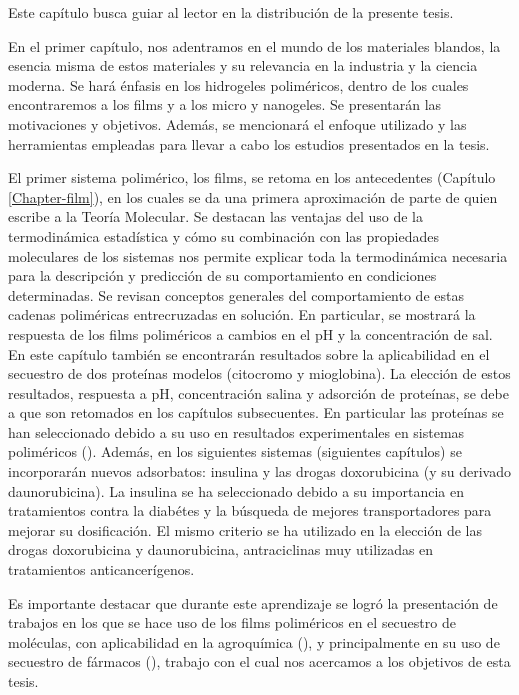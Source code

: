 \label{ruta}

 
Este cap\'itulo busca guiar al lector en la distribuci\'on de la presente tesis.

En el primer cap\'itulo, nos adentramos en el mundo de los materiales blandos, la esencia misma de estos materiales y su relevancia en la industria y la ciencia moderna. Se har\'a \'enfasis en los hidrogeles polim\'ericos, dentro de los cuales encontraremos a los films y a los micro y nanogeles. Se presentar\'an las motivaciones y objetivos. Adem\'as, se mencionar\'a el enfoque utilizado y las herramientas empleadas para llevar a cabo los estudios presentados en la tesis.

El primer sistema polim\'erico, los films, se retoma en los antecedentes (Cap\'itulo \ref{Chapter-film}), en los cuales se da una primera aproximaci\'on de parte de quien escribe a la Teor\'ia Molecular. Se destacan las ventajas del uso de la termodin\'amica estad\'istica y c\'omo su combinaci\'on con las propiedades moleculares de los sistemas nos permite explicar toda la termodin\'amica necesaria para la descripci\'on y predicci\'on de su comportamiento en condiciones determinadas. Se revisan conceptos generales del comportamiento de estas cadenas polim\'ericas entrecruzadas en soluci\'on. En particular, se mostrar\'a la respuesta de los films polim\'ericos a cambios en el pH y la concentraci\'on de sal. En este cap\'itulo tambi\'en se encontrar\'an resultados sobre la aplicabilidad en el secuestro de dos prote\'inas modelos (citocromo y mioglobina). La elecci\'on de estos resultados, respuesta a pH, concentraci\'on salina y adsorci\'on de prote\'inas, se debe a que son retomados en los cap\'itulos subsecuentes. En particular las prote\'inas se han seleccionado debido a su uso en resultados experimentales en sistemas polim\'ericos (\addcite). Adem\'as, en los siguientes sistemas (siguientes cap\'itulos) se incorporar\'an nuevos adsorbatos: insulina y las drogas doxorubicina (y su derivado daunorubicina). La insulina se ha seleccionado debido a su importancia en tratamientos contra la diab\'etes y la b\'usqueda de mejores transportadores para mejorar su dosificaci\'on. El mismo criterio se ha utilizado en la elecci\'on de las drogas doxorubicina y daunorubicina, antraciclinas muy utilizadas en tratamientos anticancer\'igenos.

Es importante destacar que durante este aprendizaje se logr\'o la presentaci\'on de trabajos en los que se hace uso de los films polim\'ericos en el secuestro de mol\'eculas, con aplicabilidad en la agroqu\'imica (), y principalmente en su uso de secuestro de f\'armacos (\addcite[polimainas]), trabajo con el cual nos acercamos a los objetivos de esta tesis.

